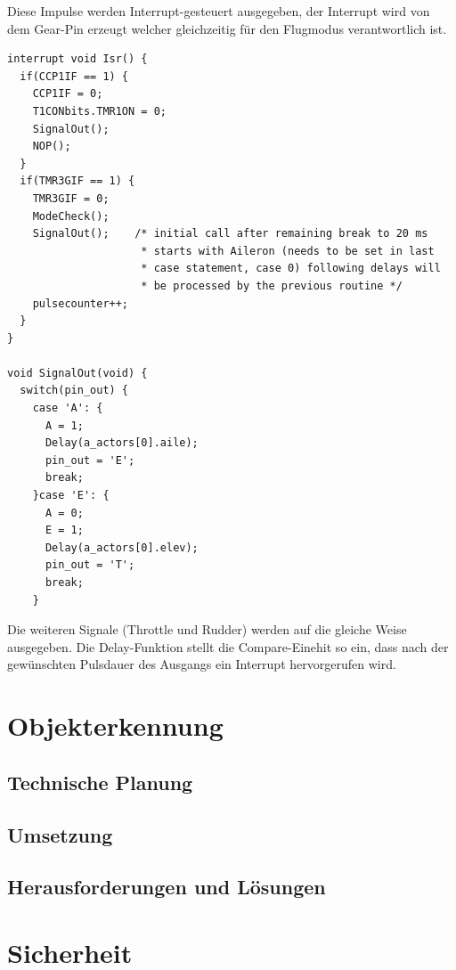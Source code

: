 \begin{itemize}
    Diese Impulse werden Interrupt-gesteuert ausgegeben, der Interrupt wird von dem Gear-Pin erzeugt welcher gleichzeitig für den Flugmodus verantwortlich ist.

    \lstset{language = c}
    \begin{lstlisting}
interrupt void Isr() {
  if(CCP1IF == 1) {
    CCP1IF = 0;
    T1CONbits.TMR1ON = 0;
    SignalOut();
    NOP();
  }
  if(TMR3GIF == 1) {
    TMR3GIF = 0;
    ModeCheck();
    SignalOut();    /* initial call after remaining break to 20 ms
                     * starts with Aileron (needs to be set in last
                     * case statement, case 0) following delays will
                     * be processed by the previous routine */
    pulsecounter++;
  }
}

void SignalOut(void) {
  switch(pin_out) {
    case 'A': {
      A = 1;
      Delay(a_actors[0].aile);
      pin_out = 'E';
      break;
    }case 'E': {
      A = 0;
      E = 1;
      Delay(a_actors[0].elev);
      pin_out = 'T';
      break;
    }
    \end{lstlisting}
    Die weiteren Signale (Throttle und Rudder) werden auf die gleiche Weise ausgegeben.
    Die Delay-Funktion stellt die Compare-Einehit so ein, dass nach der gewünschten Pulsdauer des Ausgangs ein Interrupt hervorgerufen wird.

\section{Objekterkennung}

  \subsection{Technische Planung}

  \subsection{Umsetzung}

  \subsection{Herausforderungen und Lösungen}

\section{Sicherheit}


\end{itemize}
